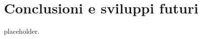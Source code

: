 \chapter{Conclusioni e sviluppi futuri}
\label{capitolo6}
\thispagestyle{empty}

\noindent placeholder.